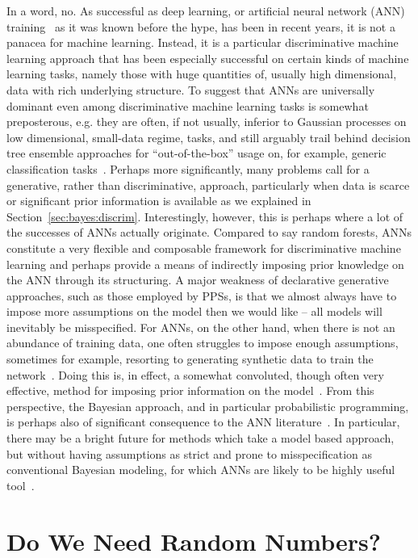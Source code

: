 In a word, no.  As successful as deep learning, or artificial neural network (ANN) training~\citep{bishop1995neural} 
as it was known before the hype,
has been in recent years, it is not a panacea for machine learning.  Instead, it is a particular discriminative
machine learning approach that has been especially successful on certain kinds of machine learning tasks,
namely those with huge quantities of, usually high dimensional, data with rich underlying structure.   
To suggest that ANNs are universally dominant even among discriminative machine learning tasks is
somewhat preposterous, e.g. they are often, if not usually, inferior to Gaussian processes on low dimensional,
small-data regime, tasks, and still arguably trail behind decision tree ensemble approaches for ``out-of-the-box''
usage on, for example, generic classification tasks~\citep{rainforth2015canonical}.   Perhaps more significantly,
many problems call for a generative, rather than discriminative, approach,
particularly when data is scarce or significant prior information is available as we explained
in Section~\ref{sec:bayes:discrim}.  Interestingly, however, this is perhaps
where a lot of the successes of ANNs actually originate.  Compared to say random forests, ANNs constitute a very
flexible and composable framework for discriminative machine learning and perhaps provide a means of 
indirectly imposing prior knowledge on the ANN through its structuring.  A major weakness of
declarative generative approaches, such as those employed by PPSs, is that we almost
always have to impose more assumptions on the model then we would like -- all models will inevitably be
misspecified.  For ANNs, on the other hand, when there is not an abundance of training data,
one often struggles to impose enough assumptions, sometimes
for example, resorting to generating synthetic data to train the network~\citep{von2008recaptcha}.  
Doing this is, in effect, a somewhat convoluted,
though often very effective, method for imposing prior information on the model~\citep{le2017using}.  From this
perspective, the Bayesian approach, and in particular probabilistic programming, is perhaps also of significant
consequence to the ANN literature~\citep{gal2016uncertainty}.
In particular, there may be a bright future for methods which
take a model based approach, but without having assumptions as strict and prone to misspecification
as conventional Bayesian modeling, for which ANNs are likely to be highly useful tool~\citep{siddharth2017learning}.

\section{Do We Need Random Numbers?}

